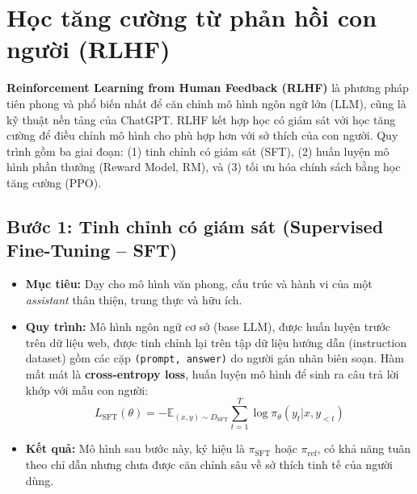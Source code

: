
\section{Học tăng cường từ phản hồi con người (RLHF)}
\label{ssec:rlhf}

\textbf{Reinforcement Learning from Human Feedback (RLHF)} \cite{christiano2017deep, stiennon2020learning} là phương pháp tiên phong và phổ biến nhất để căn chỉnh mô hình ngôn ngữ lớn (LLM), cũng là kỹ thuật nền tảng của ChatGPT.
RLHF kết hợp học có giám sát với học tăng cường để điều chỉnh mô hình cho phù hợp hơn với sở thích của con người.
Quy trình gồm ba giai đoạn: (1) tinh chỉnh có giám sát (SFT), (2) huấn luyện mô hình phần thưởng (Reward Model, RM), và (3) tối ưu hóa chính sách bằng học tăng cường (PPO).

\begin{center}
    \label{fig:rlhf_pipeline}
\end{center}

\subsection*{Bước 1: Tinh chỉnh có giám sát (Supervised Fine-Tuning -- SFT)}
\begin{itemize}
    \item \textbf{Mục tiêu:} Dạy cho mô hình văn phong, cấu trúc và hành vi của một \textit{assistant} thân thiện, trung thực và hữu ích.
    \item \textbf{Quy trình:} Mô hình ngôn ngữ cơ sở (base LLM), được huấn luyện trước trên dữ liệu web, được tinh chỉnh lại trên tập dữ liệu hướng dẫn (instruction dataset) gồm các cặp \texttt{(prompt, answer)} do người gán nhãn biên soạn.
    Hàm mất mát là \textbf{cross-entropy loss}, huấn luyện mô hình để sinh ra câu trả lời khớp với mẫu con người:
    \[
        L_{\text{SFT}}(\theta) = - \mathbb{E}_{(x,y)\sim D_{\text{SFT}}} \sum_{t=1}^{T} \log \pi_{\theta}(y_t | x, y_{<t})
    \]
    \item \textbf{Kết quả:} Mô hình sau bước này, ký hiệu là $\pi_{\text{SFT}}$ hoặc $\pi_{\text{ref}}$, có khả năng tuân theo chỉ dẫn nhưng chưa được căn chỉnh sâu về sở thích tinh tế của người dùng.
\end{itemize}

